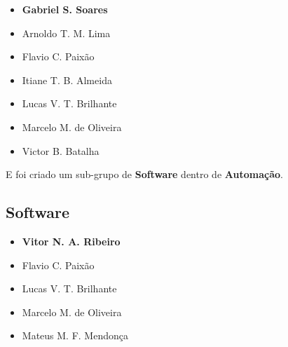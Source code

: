 \begin{itemize}
\item \textbf{Gabriel S. Soares}

\item Arnoldo T. M. Lima

\item Flavio C. Paixão

\item Itiane T. B. Almeida

\item Lucas V. T. Brilhante

\item Marcelo M. de Oliveira

\item Victor B. Batalha\\
\end{itemize}

E foi criado um sub-grupo de \textbf{Software} dentro de \textbf{Automação}.

\subsection{Software}

\begin{itemize}

\item \textbf{Vitor N. A. Ribeiro}

\item Flavio C. Paixão

\item Lucas V. T. Brilhante

\item Marcelo M. de Oliveira

\item Mateus M. F. Mendonça
\end{itemize}
